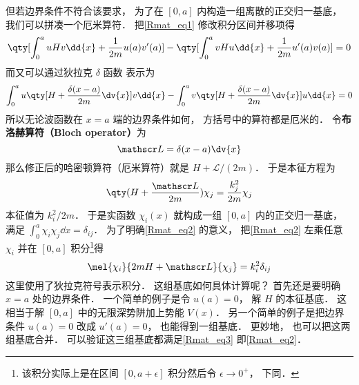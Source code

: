 但若边界条件不符合该要求， 为了在 $[0,a]$ 内构造一组离散的正交归一基底， 我们可以拼凑一个厄米算符． 把\autoref{Rmat_eq1} 修改积分区间并移项得
\begin{equation}
\qty[\int_{0}^{a} uHv\dd{x} + \frac{1}{2m}u(a)v'(a)] - \qty[\int_{0}^{a} vHu\dd{x} + \frac{1}{2m}u'(a)v(a)]
= 0
\end{equation}
而又可以通过狄拉克 $\delta$ 函数 表示为
\begin{equation}
\int_{0}^{a} u\qty[H + \frac{\delta(x-a)}{2m}\dv{x}] v\dd{x} -
\int_{0}^{a} v\qty[H + \frac{\delta(x-a)}{2m}\dv{x}] u\dd{x} = 0
\end{equation}
所以无论波函数在 $x=a$ 端的边界条件如何， 方括号中的算符都是厄米的． 令\textbf{布洛赫算符（Bloch operator）}为
\begin{equation}\label{Rmat_eq6}
\mathscr L = \delta(x-a)\dv{x}
\end{equation}
那么修正后的哈密顿算符（厄米算符）就是 $H + \mathscr L/(2m)$． 于是本征方程为
\begin{equation}\label{Rmat_eq2}
\qty(H + \frac{\mathscr L}{2m})\chi_j = \frac{k_j^2}{2m} \chi_j
\end{equation}
本征值为 ${k_i^2}/{2m}$． 于是实函数 $\chi_i(x)$ 就构成一组 $[0, a]$ 内的正交归一基底， 满足 $\int_0^a \chi_i \chi_j \dd{x} = \delta_{ij}$． 为了明确\autoref{Rmat_eq2} 的意义， 把\autoref{Rmat_eq2} 左乘任意 $\chi_i$ 并在 $[0,a]$ 积分\footnote{该积分实际上是在区间 $[0,a+\epsilon]$ 积分然后令 $\epsilon\to 0^+$， 下同．}得
\begin{equation}\label{Rmat_eq3}
\mel{\chi_i}{2mH + \mathscr L}{\chi_j} = k_i^2 \delta_{ij}
\end{equation}
这里使用了狄拉克符号表示积分． 这组基底如何具体计算呢？ 首先还是要明确 $x=a$ 处的边界条件． 一个简单的例子是令 $u(a) = 0$， 解 $H$ 的本征基底． 这相当于解 $[0,a]$ 中的无限深势阱加上势能 $V(x)$． 另一个简单的例子是把边界条件 $u(a) = 0$ 改成 $u'(a) = 0$， 也能得到一组基底． 更妙地， 也可以把这两组基底合并． 可以验证这三组基底都满足\autoref{Rmat_eq3} 即\autoref{Rmat_eq2}．

